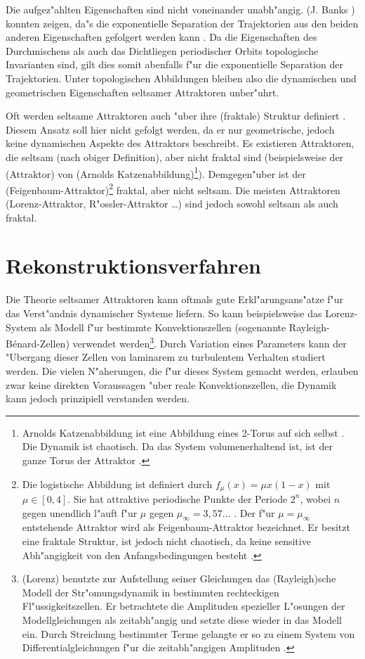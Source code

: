 Die aufgez"ahlten Eigenschaften sind nicht voneinander unabh"angig. \autor(J. Banks \etal)
konnten zeigen, da"s die exponentielle Separation der Trajektorien aus den beiden anderen
Eigenschaften gefolgert werden kann \cite{Banks92}. Da die Eigenschaften des Durchmischens
als auch das Dichtliegen periodischer Orbits topologische Invarianten sind, gilt
dies somit abenfalls f"ur die exponentielle Separation der Trajektorien. Unter
topologischen Abbildungen bleiben also die dynamischen und geometrischen Eigenschaften
seltsamer Attraktoren unber"uhrt.

Oft werden seltsame Attraktoren auch "uber ihre \begriff(fraktale) Struktur definiert
\cite{Peitgen92}. Diesem Ansatz soll hier nicht gefolgt werden, da er nur geometrische,
jedoch keine dynamischen Aspekte des Attraktors beschreibt. Es existieren Attraktoren, die
seltsam (nach obiger Definition), aber nicht fraktal sind (beispielsweise der
\naja(Attraktor) von \begriff(Arnolds Katzenabbildung)\footnote{Arnolds Katzenabbildung
  ist eine Abbildung eines 2-Torus auf sich selbst \cite{Arnold68}. Die Dynamik ist
  chaotisch. Da das System volumenerhaltend ist, ist der ganze Torus der Attraktor
  \cite{Eckmann-ruelle}.  }). Demgegen"uber ist der
\begriff(Feigenbaum-Attraktor)\footnote{Die logistische Abbildung ist definiert durch
  $f_\mu(x)=\mu x(1-x)$ mit $\mu\in[0,4]$. Sie hat attraktive periodische Punkte der
  Periode $2^n$, wobei $n$ gegen unendlich l"auft f"ur $\mu$ gegen $\mu_\infty=3,57\dots$
  . Der f"ur $\mu=\mu_\infty$ entstehende Attraktor wird als Feigenbaum-Attraktor
  bezeichnet. Er besitzt eine fraktale Struktur, ist jedoch nicht chaotisch, da keine
  sensitive Abh"angigkeit von den Anfangsbedingungen besteht \cite{Eckmann-ruelle}.}
fraktal, aber nicht seltsam.  Die meisten Attraktoren (Lorenz-Attraktor,
R"ossler-Attraktor \dots) sind jedoch sowohl seltsam als auch fraktal.


\section{Rekonstruktionsverfahren}

Die Theorie seltsamer Attraktoren kann oftmals gute Erkl"arungsans"atze f"ur das
Ver\-st"andnis dynamischer Systeme liefern. So kann beispielsweise das Lorenz-System als
Modell f"ur bestimmte Konvektionszellen (sogenannte Rayleigh-B\'enard-Zellen) verwendet
werden\footnote{\autor(Lorenz) benutzte zur Aufstellung seiner Gleichungen das
  \autor(Rayleigh)sche Modell der Str"omungsdynamik in bestimmten rechteckigen
  Fl"ussigkeitszellen. Er betrachtete die Amplituden spezieller L"osungen der
  Modellgleichungen als zeitabh"angig und setzte diese wieder in das Modell ein. Durch
  Streichung bestimmter Terme gelangte er so zu einem System von Differentialgleichungen
  f"ur die zeitabh"angigen Amplituden \cite{Peitgen92}.}. Durch Variation eines Parameters kann der
"Ubergang dieser Zellen von laminarem zu turbulentem Verhalten studiert werden. Die vielen
N"aherungen, die f"ur dieses System gemacht werden, erlauben zwar keine direkten
Voraussagen "uber reale Konvektionszellen, die Dynamik kann jedoch prinzipiell verstanden
werden.

